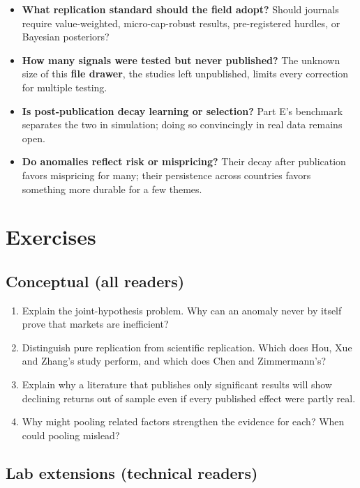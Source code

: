 \begin{itemize}
  \item \textbf{What replication standard should the field adopt?} Should journals require value-weighted, micro-cap-robust results, pre-registered hurdles, or Bayesian posteriors?
  \item \textbf{How many signals were tested but never published?} The unknown size of this \textbf{file drawer}, the studies left unpublished, limits every correction for multiple testing.
  \item \textbf{Is post-publication decay learning or selection?} Part E's benchmark separates the two in simulation; doing so convincingly in real data remains open.
  \item \textbf{Do anomalies reflect risk or mispricing?} Their decay after publication favors mispricing for many; their persistence across countries favors something more durable for a few themes.
\end{itemize}

\section*{Exercises}

\subsection*{Conceptual (all readers)}

\begin{enumerate}
  \item Explain the joint-hypothesis problem. Why can an anomaly never by itself prove that markets are inefficient?
  \item Distinguish pure replication from scientific replication. Which does Hou, Xue and Zhang's study perform, and which does Chen and Zimmermann's?
  \item Explain why a literature that publishes only significant results will show declining returns out of sample even if every published effect were partly real.
  \item Why might pooling related factors strengthen the evidence for each? When could pooling mislead?
\end{enumerate}

\subsection*{Lab extensions (technical readers)}

